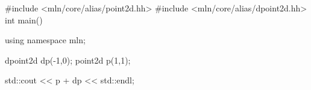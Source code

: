 #include <mln/core/alias/point2d.hh>
#include <mln/core/alias/dpoint2d.hh>
int main()
{
  using namespace mln;

  dpoint2d dp(-1,0);
  point2d p(1,1);

  std::cout << p + dp << std::endl;
}
